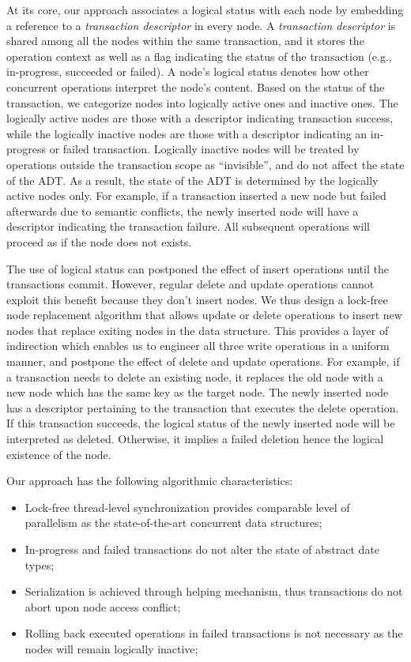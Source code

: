 \documentclass[10pt,conference,compsocconf]{IEEEtran}
\begin{document}
At its core, our approach associates a logical status with each node by embedding a reference to a \emph{transaction descriptor} in every node.
A \emph{transaction descriptor} is shared among all the nodes within the same transaction, and it stores the operation context as well as a flag indicating the status of the transaction (e.g., in-progress, succeeded or failed).
A node's logical status denotes how other concurrent operations interpret the node's content.
Based on the status of the transaction, we categorize nodes into logically active ones and inactive ones.
The logically active nodes are those with a descriptor indicating transaction success, while the logically inactive nodes are those with a descriptor indicating an in-progress or failed transaction.
Logically inactive nodes will be treated by operations outside the transaction scope as ``invisible'', and do not affect the state of the ADT. 
As a result, the state of the ADT is determined by the logically active nodes only.
For example, if a transaction inserted a new node but failed afterwards due to semantic conflicts, the newly inserted node will have a descriptor indicating the transaction failure.
All subsequent operations will proceed as if the node does not exists.

The use of logical status can postponed the effect of insert operations until the transactions commit.
However, regular delete and update operations cannot exploit this benefit because they don't insert nodes. 
We thus design a lock-free node replacement algorithm that allows update or delete operations to insert new nodes that replace exiting nodes in the data structure.
This provides a layer of indirection which enables us to engineer all three write operations in a uniform manner, and postpone the effect of delete and update operations.
For example, if a transaction needs to delete an existing node, it replaces the old node with a new node which has the same key as the target node. 
The newly inserted node has a descriptor pertaining to the transaction that executes the delete operation.
If this transaction succeeds, the logical status of the newly inserted node will be interpreted as deleted. 
Otherwise, it implies a failed deletion hence the logical existence of the node.

Our approach has the following algorithmic characteristics:
\begin{itemize}
    \item Lock-free thread-level synchronization provides comparable level of parallelism as the state-of-the-art concurrent data structures;
    \item In-progress and failed transactions do not alter the state of abstract date types;
    \item Serialization is achieved through helping mechanism, thus transactions do not abort upon node access conflict; 
    \item Rolling back executed operations in failed transactions is not necessary as the nodes will remain logically inactive;
\end{itemize}
\end{document}
